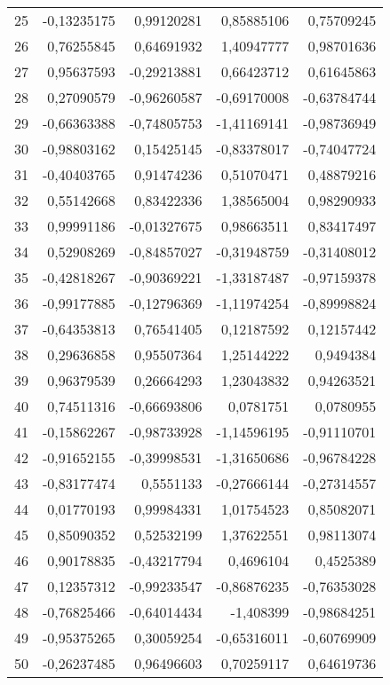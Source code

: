 \documentclass[12pt]{article}
\begin{document}
\begin{longtable}{lrrrr}
 25 & -0,13235175 & 0,99120281 & 0,85885106 & 0,75709245 \\
 26 & 0,76255845 & 0,64691932 & 1,40947777 & 0,98701636 \\
 27 & 0,95637593 & -0,29213881 & 0,66423712 & 0,61645863 \\
 28 & 0,27090579 & -0,96260587 & -0,69170008 & -0,63784744 \\
 29 & -0,66363388 & -0,74805753 & -1,41169141 & -0,98736949 \\
 30 & -0,98803162 & 0,15425145 & -0,83378017 & -0,74047724 \\
 31 & -0,40403765 & 0,91474236 & 0,51070471 & 0,48879216 \\
 32 & 0,55142668 & 0,83422336 & 1,38565004 & 0,98290933 \\
 33 & 0,99991186 & -0,01327675 & 0,98663511 & 0,83417497 \\
 34 & 0,52908269 & -0,84857027 & -0,31948759 & -0,31408012 \\
 35 & -0,42818267 & -0,90369221 & -1,33187487 & -0,97159378 \\
 36 & -0,99177885 & -0,12796369 & -1,11974254 & -0,89998824 \\
 37 & -0,64353813 & 0,76541405 & 0,12187592 & 0,12157442 \\
 38 & 0,29636858 & 0,95507364 & 1,25144222 &  0,9494384 \\
 39 & 0,96379539 & 0,26664293 & 1,23043832 & 0,94263521 \\
 40 & 0,74511316 & -0,66693806 &  0,0781751 &  0,0780955 \\
 41 & -0,15862267 & -0,98733928 & -1,14596195 & -0,91110701 \\
 42 & -0,91652155 & -0,39998531 & -1,31650686 & -0,96784228 \\
 43 & -0,83177474 &  0,5551133 & -0,27666144 & -0,27314557 \\
 44 & 0,01770193 & 0,99984331 & 1,01754523 & 0,85082071 \\
 45 & 0,85090352 & 0,52532199 & 1,37622551 & 0,98113074 \\
 46 & 0,90178835 & -0,43217794 &  0,4696104 &  0,4525389 \\
 47 & 0,12357312 & -0,99233547 & -0,86876235 & -0,76353028 \\
 48 & -0,76825466 & -0,64014434 &  -1,408399 & -0,98684251 \\
 49 & -0,95375265 & 0,30059254 & -0,65316011 & -0,60769909 \\
 50 & -0,26237485 & 0,96496603 & 0,70259117 & 0,64619736 \\

\end{longtable}
\end{document}
